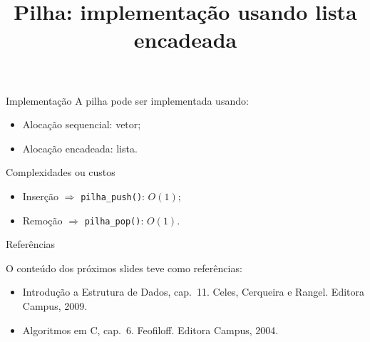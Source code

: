 \begin{frame}{\inserttitle}{Implementação} 
  A pilha pode ser implementada usando:

  \begin{itemize}
  \item Alocação sequencial: vetor;
  \item Alocação encadeada: lista.
  \end{itemize}
\end{frame}


\begin{frame}{\inserttitle}{Complexidades ou custos} 

  \begin{itemize}
  \item Inserção $\Rightarrow$ {\tt pilha\_push()}: $O(1)$;
  \item Remoção $\Rightarrow$ {\tt pilha\_pop()}: $O(1)$.
  \end{itemize}

\end{frame}



\title{Pilha: implementação usando lista encadeada}
\frame{\maketitle}

\begin{frame}{Referências}
  
  O conteúdo dos próximos slides teve como referências:

  \begin{itemize}
  \item Introdução a Estrutura de Dados, cap.~11. Celes, Cerqueira e Rangel. Editora Campus, 2009.
  \item Algoritmos em C, cap.~6. Feofiloff. Editora Campus, 2004.
  \end{itemize}

\end{frame}

